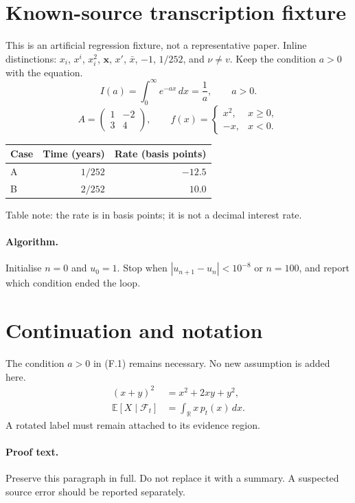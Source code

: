 \documentclass{article}
\begin{document}
\section*{Known-source transcription fixture}
This is an artificial regression fixture, not a representative paper.
Inline distinctions: $x_i$, $x^i$, $x_i^2$, $\mathbf{x}$, $x'$, $\bar{x}$,
$-1$, $1/252$, and $\nu\ne v$. Keep the condition $a>0$ with the equation.
\begin{equation}\tag{F.1}
 I(a)=\int_0^{\infty} e^{-a x}\,dx=\frac{1}{a},\qquad a>0.
\end{equation}
\begin{equation}\tag{F.2}
 A=\begin{pmatrix}1&-2\\3&4\end{pmatrix},\qquad
 f(x)=\begin{cases}x^2,&x\ge0,\\-x,&x<0.\end{cases}
\end{equation}
\begin{center}
\begin{tabular}{lrr}
Case & Time (years) & Rate (basis points)\\\hline
A & $1/252$ & $-12.5$\\
B & $2/252$ & $10.0$\\
\end{tabular}
\end{center}
Table note: the rate is in basis points; it is not a decimal interest rate.
\paragraph{Algorithm.} Initialise $n=0$ and $u_0=1$. Stop when
$|u_{n+1}-u_n|<10^{-8}$ or $n=100$, and report which condition ended the loop.
\newpage
\section*{Continuation and notation}
The condition $a>0$ in (F.1) remains necessary. No new assumption is added here.
\begin{align}
 (x+y)^2 &= x^2+2xy+y^2,\tag{F.3}\\
 \mathbb{E}[X\mid\mathcal F_t]&=\int_{\mathbb R}x\,p_t(x)\,dx.\tag{F.4}
\end{align}
\noindent{}
\quad A rotated label must remain attached to its evidence region.
\paragraph{Proof text.} Preserve this paragraph in full. Do not replace it with
a summary. A suspected source error should be reported separately.
\end{document}
